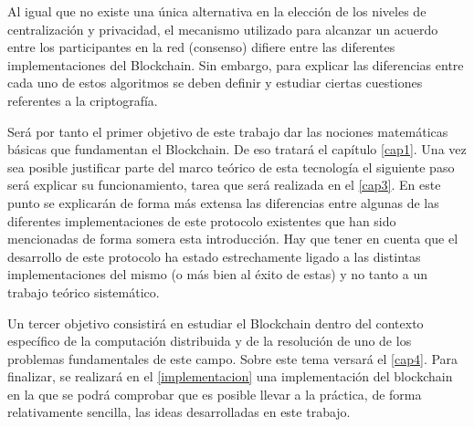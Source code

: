 Al igual que no existe una única alternativa en la elección de los niveles de centralización y privacidad, el mecanismo utilizado para alcanzar un acuerdo entre los participantes en la red (consenso) difiere entre las diferentes implementaciones del Blockchain. Sin embargo, para explicar las diferencias entre cada uno de estos algoritmos se deben definir y estudiar ciertas cuestiones referentes a la criptografía.%

Será por tanto el primer objetivo de este trabajo dar las nociones matemáticas básicas que fundamentan el Blockchain. De eso tratará el capítulo \ref{cap1}. Una vez sea posible justificar parte del marco teórico de esta tecnología el siguiente paso será explicar su funcionamiento, tarea que será realizada en el \ref{cap3}. En este punto se explicarán de forma más extensa las diferencias entre algunas de las diferentes implementaciones de este protocolo existentes que han sido mencionadas de forma somera esta introducción. Hay que tener en cuenta que el desarrollo de este protocolo ha estado estrechamente ligado a las distintas implementaciones del mismo (o más bien al éxito de estas) y no tanto a un trabajo teórico sistemático. 

Un tercer objetivo consistirá en estudiar el Blockchain dentro del contexto específico de la computación distribuida y de la resolución de uno de los problemas fundamentales de este campo. Sobre este tema versará el \ref{cap4}. Para finalizar, se realizará en el \ref{implementacion} una implementación del blockchain en la que se podrá comprobar que es posible llevar a la práctica, de forma relativamente sencilla, las ideas desarrolladas en este trabajo.









